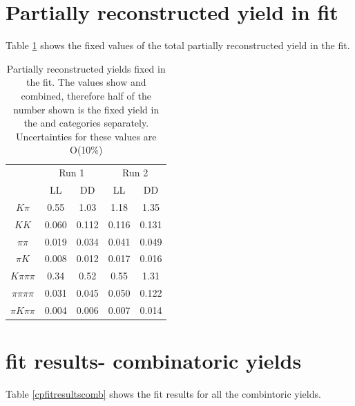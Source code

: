 \clearpage

\section{Partially reconstructed yield in \CP fit}
\label{sec:app:partrecoyields}

Table \ref{partrecofixedyields} shows the fixed values of the total partially reconstructed yield in the \CP fit.

\begin{table}[h]
\centering
\begin{tabular}{c|cc|cc}
\hline
& \multicolumn{2}{c}{Run 1} & \multicolumn{2}{c}{Run 2} \\
& LL & DD & LL & DD \\
\hline
$K\pi$ & 0.55 & 1.03 & 1.18 & 1.35 \\
$KK$ & 0.060 & 0.112 & 0.116 & 0.131 \\
$\pi\pi$ & 0.019 & 0.034 & 0.041 & 0.049 \\
$\pi K$ & 0.008 & 0.012 & 0.017 & 0.016 \\
$K\pi\pi\pi$ & 0.34 & 0.52 & 0.55 & 1.31 \\
$\pi\pi\pi\pi$ & 0.031 & 0.045 & 0.050 & 0.122  \\
$\pi K\pi\pi$ & 0.004 & 0.006 & 0.007 & 0.014 \\
\hline
\end{tabular}
\caption{Partially reconstructed yields fixed in the \CP fit. The values show \Bp and \Bm combined, therefore half of the number shown is the fixed yield in the \Bp and \Bm categories separately. Uncertainties for these values are O(10\%)}
\label{partrecofixedyields}
\end{table}

\clearpage

\section{\CP fit results- combinatoric yields}
\label{sec:app:cpfit}

Table \ref{cpfitresultscomb} shows the fit results for all the combintoric yields.

